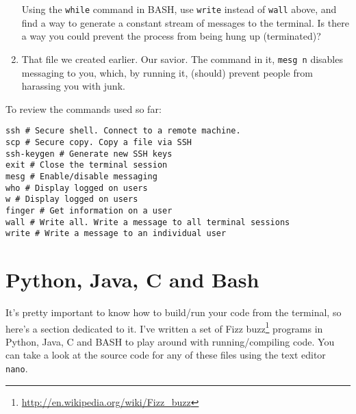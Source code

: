 \documentclass{article}
\begin{document}
\begin{enumerate}
Using the \texttt{while} command in BASH, use \texttt{write} instead of \texttt{wall} above, and find a way to generate a constant stream of messages to the terminal. Is there a way you could prevent the process from being hung up (terminated)?
\item That file we created earlier. Our savior. The command in it, \texttt{mesg n} disables messaging to you, which, by running it, (should) prevent people from harassing you with junk. 
\end{enumerate}
To review the commands used so far:
\begin{verbatim}
ssh # Secure shell. Connect to a remote machine.
scp # Secure copy. Copy a file via SSH
ssh-keygen # Generate new SSH keys
exit # Close the terminal session
mesg # Enable/disable messaging
who # Display logged on users
w # Display logged on users
finger # Get information on a user
wall # Write all. Write a message to all terminal sessions
write # Write a message to an individual user
\end{verbatim}

\section{Python, Java, C and Bash}
It's pretty important to know how to build/run your code from the terminal, so here's a section dedicated to it. I've written a set of Fizz buzz\footnote{\url{http://en.wikipedia.org/wiki/Fizz_buzz}} programs in Python, Java, C and BASH to play around with running/compiling code. You can take a look at the source code for any of these files using the text editor \texttt{nano}. 
\end{document}
